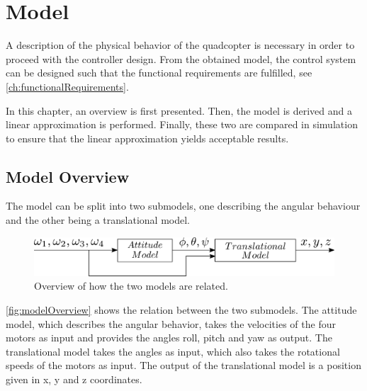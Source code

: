 \chapter{Model}\label{chap:Model}
A description of the physical behavior of the quadcopter is necessary in order to proceed with the controller design. From the obtained model, the control system can be designed such that the functional requirements are fulfilled, see \autoref{ch:functionalRequirements}.

In this chapter, an overview is first presented. Then, the model is derived and a linear approximation is performed. Finally, these two are compared in simulation to ensure that the linear approximation yields acceptable results.

\section{Model Overview} \label{sec:ModelOverview}
The model can be split into two submodels, one describing the angular behaviour and the other being a translational model.
\begin{figure}[H]
    \centering
    \includegraphics[scale=0.3]{figures/modelOverview}
    \caption{Overview of how the two models are related.}
    \label{fig:modelOverview}
\end{figure}
%
\autoref{fig:modelOverview} shows the relation between the two submodels. The attitude model, which describes the angular behavior, takes the velocities of the four motors as input and provides the angles roll, pitch and yaw as output. The translational model takes the angles as input, which also takes the rotational speeds of the motors as input. The output of the translational model is a position given in x, y and z coordinates.

